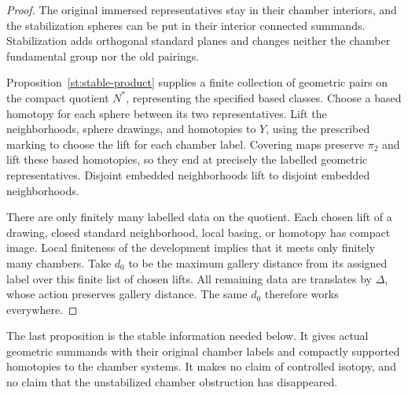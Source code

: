 \begin{proof}
The original immersed representatives stay in their chamber interiors,
and the stabilization spheres can be put in their interior connected
summands.  Stabilization adds orthogonal standard planes and changes
neither the chamber fundamental group nor the old pairings.

Proposition~\ref{st:stable-product} supplies a finite collection of
geometric pairs on the compact quotient $N^*$, representing the
specified based classes.  Choose a based homotopy for each sphere
between its two representatives.  Lift the neighborhoods, sphere
drawings, and homotopies to $Y$, using the prescribed marking to choose
the lift for each chamber label.  Covering maps preserve $\pi_2$ and
lift these based homotopies, so they end at precisely the labelled
geometric representatives.  Disjoint embedded neighborhoods lift to
disjoint embedded neighborhoods.

There are only finitely many labelled data on the quotient.  Each chosen
lift of a drawing, closed standard neighborhood, local basing, or
homotopy has compact image.  Local finiteness of the development implies
that it meets only finitely many chambers.  Take $d_0$ to be the maximum
gallery distance from its assigned label over this finite list of
chosen lifts.  All remaining data are translates by $\Delta$, whose
action preserves gallery distance.  The same $d_0$ therefore works
everywhere.
\end{proof}

The last proposition is the stable information needed below.  It gives
actual geometric summands with their original chamber labels and
compactly supported homotopies to the chamber systems.  It makes no
claim of controlled isotopy, and no claim that the unstabilized chamber
obstruction has disappeared.
